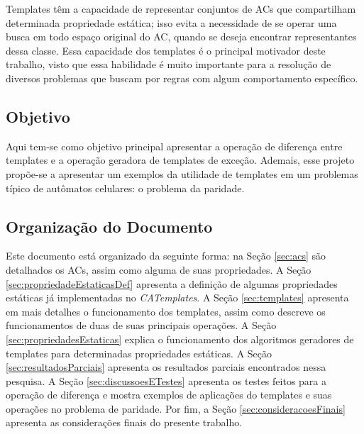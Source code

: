 Templates têm a capacidade de representar conjuntos de ACs que compartilham determinada propriedade estática; isso evita a necessidade de se operar uma busca em todo espaço original do AC, quando se deseja encontrar representantes dessa classe. Essa capacidade dos templates é o principal motivador deste trabalho, visto que essa habilidade é muito importante para a resolução de diversos problemas que buscam por regras com algum comportamento específico.

\subsection{Objetivo}%
Aqui tem-se como objetivo principal apresentar a operação de diferença entre templates e a operação geradora de templates de exceção. Ademais, esse projeto propõe-se a apresentar um exemplos da utilidade de templates em um problemas típico de autômatos celulares: o problema da paridade.

\subsection{Organização do Documento}
Este documento está organizado da seguinte forma: na Seção \ref{sec:acs} são detalhados os ACs, assim como alguma de suas propriedades. A Seção \ref{sec:propriedadeEstaticasDef} apresenta a definição de  algumas propriedades estáticas já implementadas no \textit{CATemplates}. A Seção \ref{sec:templates} apresenta em mais detalhes o funcionamento dos templates, assim como descreve os funcionamentos de duas de suas principais operações. A Seção \ref{sec:propriedadesEstaticas} explica o funcionamento dos algoritmos geradores de templates para determinadas propriedades estáticas. A Seção \ref{sec:resultadosParciais} apresenta os resultados parciais encontrados nessa pesquisa. A Seção \ref{sec:discussoesETestes} apresenta os testes feitos para a operação de diferença e mostra exemplos de aplicações do templates e  suas operações no problema de paridade. Por fim, a Seção \ref{sec:consideracoesFinais} apresenta as considerações finais do presente trabalho.